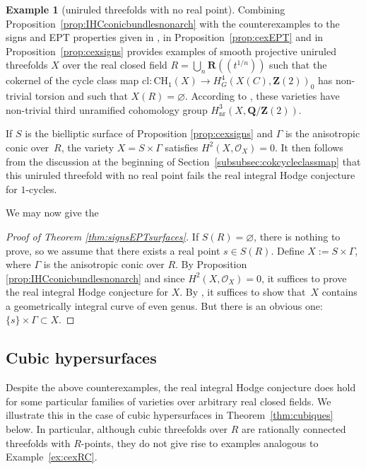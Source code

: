 \documentclass[JEP,XML,SOM,Unicode]{cedram}
\newcommand{\lpr}{(\!(}
\newcommand{\rpr}{)\!)}
\theoremstyle{plain}
\theoremstyle{definition}
\newtheorem{example}[thm]{Example}
\numberwithin{equation}{section}
\newcommand{\cl}{{\mathrm{cl}}}
\newcommand{\sO}{{\mathscr O}}
\newcommand{\Q}{{\mathbf Q}}
\newcommand{\R}{{\mathbf R}}
\newcommand{\Z}{{\mathbf Z}}
\newcommand{\CH}{\mathrm{CH}}
\newcommand{\nr}{\mathrm{nr}}
\renewcommand{\emptyset}{\varnothing}
\begin{document}
\begin{example}[uniruled threefolds with no real point]
\label{ex:cexuniruled}
Combining Proposition~\ref{prop:IHCconicbundlesnonarch} with the counterexamples to the signs and EPT properties given in \cite[Ex.\,15.2.2]{bcr}, in Proposition~\ref{prop:cexEPT} and in Proposition~\ref{prop:cexsigns} provides examples of smooth projective uniruled threefolds $X$ over the real closed field $R=\bigcup_n\R\lpr t^{1/n}\rpr$ such that the cokernel of the cycle class map $\cl:\CH_1(X)\to H^4_G(X(C),\Z(2))_0$ has non-trivial torsion and such that $X(R)=\emptyset$. According to \cite[Prop.\,\ref*{BW1-prop:ihc defect and bo}]{BW1}, these varieties have non-trivial third unramified cohomology group $H^3_{\nr}(X,\Q/\Z(2))$.

If $S$ is the bielliptic surface of Proposition \ref{prop:cexsigns} and $\Gamma$ is the anisotropic conic over~$R$, the variety $X=S\times \Gamma$ satisfies $H^2(X,\sO_X)=0$. It then follows from the discussion at the beginning of Section~\ref{subsubsec:cokcycleclassmap} that this uniruled threefold with no real point fails the real integral Hodge conjecture for $1$-cycles.
\end{example}

We may now give the

\begin{proof}[Proof of Theorem \ref{thm:signsEPTsurfaces}]
If $S(R)=\emptyset$, there is nothing to prove, so we assume that there exists a real point $s\in S(R)$. Define $X:=S\times\Gamma$, where $\Gamma$ is the anisotropic conic over $R$.
By Proposition \ref{prop:IHCconicbundlesnonarch} and since $H^2(X,\sO_X)=0$, it suffices to prove the real integral Hodge conjecture for $X$. By \cite[Th.\,\ref*{BW1-thm:relation ihc phi}]{BW1}, it suffices to show that~$X$ contains a geometrically integral curve of even genus. But there is an obvious one: $\{s\}\times\Gamma\subset X$.
\end{proof}

\subsection{Cubic hypersurfaces}
\label{subsec:cubichypersurfaces}

Despite the above counterexamples, the real integral Hodge conjecture does hold for some particular families of varieties over arbitrary real closed fields. We illustrate this in the case of cubic hypersurfaces in Theorem~\ref{thm:cubiques} below. In particular, although cubic threefolds over $R$ are rationally connected threefolds with $R$-points, they do not give rise to examples analogous to Example~\ref{ex:cexRC}.
\end{document}
